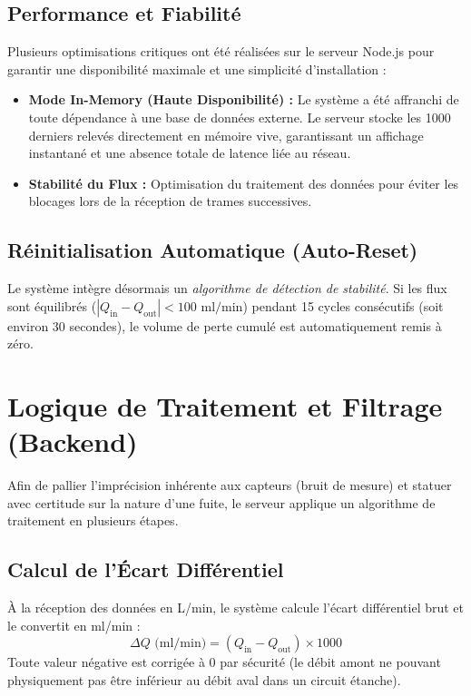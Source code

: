 \documentclass[12pt,a4paper]{article}
\begin{document}
\subsection{Performance et Fiabilité}
Plusieurs optimisations critiques ont été réalisées sur le serveur Node.js pour garantir une disponibilité maximale et une simplicité d'installation :
\begin{itemize}
    \item \textbf{Mode In-Memory (Haute Disponibilité) :} Le système a été affranchi de toute dépendance à une base de données externe. Le serveur stocke les 1000 derniers relevés directement en mémoire vive, garantissant un affichage instantané et une absence totale de latence liée au réseau.
    \item \textbf{Stabilité du Flux :} Optimisation du traitement des données pour éviter les blocages lors de la réception de trames successives.
\end{itemize}

\subsection{Réinitialisation Automatique (Auto-Reset)}
Le système intègre désormais un \textit{algorithme de détection de stabilité}. Si les flux sont équilibrés ($ |Q_{\text{in}} - Q_{\text{out}}| < 100 \text{ ml/min}$) pendant 15 cycles consécutifs (soit environ 30 secondes), le volume de perte cumulé est automatiquement remis à zéro.

\section{Logique de Traitement et Filtrage (Backend)}
Afin de pallier l'imprécision inhérente aux capteurs (bruit de mesure) et statuer avec certitude sur la nature d'une fuite, le serveur applique un algorithme de traitement en plusieurs étapes.

\subsection{Calcul de l'Écart Différentiel}
À la réception des données en L/min, le système calcule l'écart différentiel brut et le convertit en ml/min :
\begin{equation}
\Delta Q \text{ (ml/min)} = (Q_{\text{in}} - Q_{\text{out}}) \times 1000
\end{equation}
Toute valeur négative est corrigée à $0$ par sécurité (le débit amont ne pouvant physiquement pas être inférieur au débit aval dans un circuit étanche).
\end{document}
